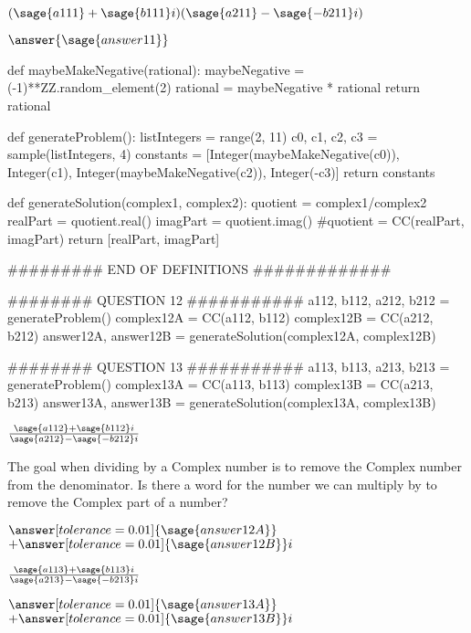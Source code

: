\documentclass{ximera}
\begin{document}
\begin{exercise}
	$(\sage{a111}+\sage{b111}i)(\sage{a211}-\sage{-b211}i)$

	$\answer{\sage{answer11}}$
\end{exercise}

\begin{sagesilent}
def maybeMakeNegative(rational):
    maybeNegative = (-1)**ZZ.random_element(2)
    rational = maybeNegative * rational
    return rational

def generateProblem():
    listIntegers = range(2, 11)
    c0, c1, c2, c3 = sample(listIntegers, 4)
    constants = [Integer(maybeMakeNegative(c0)), Integer(c1), Integer(maybeMakeNegative(c2)), Integer(-c3)]
    return constants

def generateSolution(complex1, complex2):
    quotient = complex1/complex2
    realPart = quotient.real()
    imagPart = quotient.imag()
    #quotient = CC(realPart, imagPart)
    return [realPart, imagPart]

######### END OF DEFINITIONS #############

######## QUESTION 12 ###########
a112, b112, a212, b212 = generateProblem()
complex12A = CC(a112, b112)
complex12B = CC(a212, b212)
answer12A, answer12B = generateSolution(complex12A, complex12B)

######## QUESTION 13 ###########
a113, b113, a213, b213 = generateProblem()
complex13A = CC(a113, b113)
complex13B = CC(a213, b213)
answer13A, answer13B = generateSolution(complex13A, complex13B)
\end{sagesilent}

\begin{exercise}
	$\frac{\sage{a112}+\sage{b112}i}{\sage{a212}-\sage{-b212}i}$

\begin{hint}
The goal when dividing by a Complex number is to remove the Complex number from the denominator. Is there a word for the number we can multiply by to remove the Complex part of a number?
\end{hint}

	$\answer[tolerance=0.01]{\sage{answer12A}}$ $+ \answer[tolerance=0.01]{\sage{answer12B}}i$
\end{exercise}

\begin{exercise}
	$\frac{\sage{a113}+\sage{b113}i}{\sage{a213}-\sage{-b213}i}$

	$\answer[tolerance=0.01]{\sage{answer13A}}$ $+ \answer[tolerance=0.01]{\sage{answer13B}}i$
\end{exercise}
\end{document}
